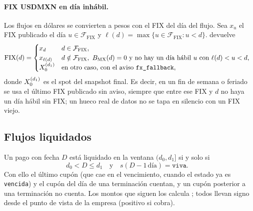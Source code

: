 \paragraph{FIX USDMXN en día inhábil.} Los flujos en dólares se convierten a pesos con el FIX del día del flujo. Sea $x_u$ el FIX publicado el día $u \in \mathcal{F}_{\mathrm{FIX}}$ y $\ell(d) = \max\{u \in \mathcal{F}_{\mathrm{FIX}} : u < d\}$.  devuelve
\begin{equation}\label{eq:cap08-fix}
  \mathrm{FIX}(d) =
  \begin{cases}
    x_d & d \in \mathcal{F}_{\mathrm{FIX}},\\
    x_{\ell(d)} & d \notin \mathcal{F}_{\mathrm{FIX}},\ B_{\mathrm{MX}}(d) = 0 \text{ y no hay un día hábil } u \text{ con } \ell(d) < u < d,\\
    \Spot^{(d_1)} & \text{en otro caso, con el aviso } \texttt{fx\_fallback},
  \end{cases}
\end{equation}
donde $X_0^{(d_1)}$ es el spot del snapshot final. Es decir, en un fin de semana o feriado se usa el último FIX publicado sin aviso, siempre que entre ese FIX y $d$ no haya un día hábil sin FIX; un hueco real de datos no se tapa en silencio con un FIX viejo.

\subsection{Flujos liquidados}\label{sec:cap08-liquidados}

Un pago con fecha $D$ está liquidado en la ventana $(d_0, d_1]$ si y solo si
\begin{equation}\label{eq:cap08-liquidado}
  d_0 < D \le d_1 \quad\text{y}\quad s(D - 1\,\text{día}) = \texttt{viva}.
\end{equation}
Con ello el último cupón (que cae en el vencimiento, cuando el estado ya es \texttt{vencida}) y el cupón del día de una terminación cuentan, y un cupón posterior a una terminación no cuenta. Los montos que siguen los calcula ; todos llevan signo desde el punto de vista de la empresa (positivo si cobra).

